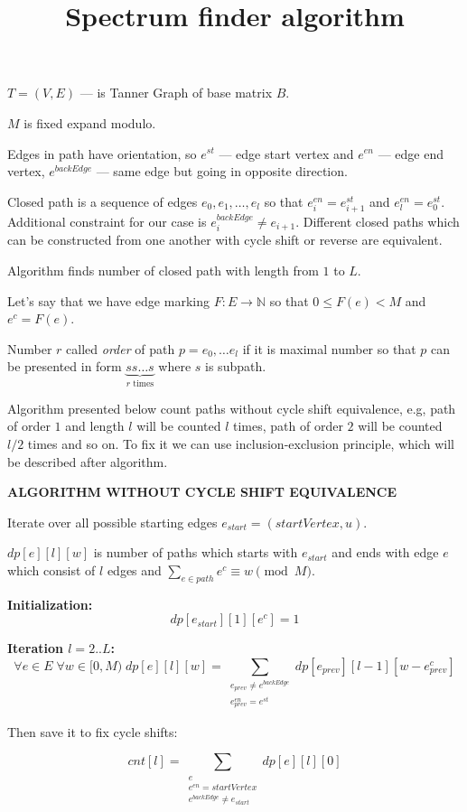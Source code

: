 \documentclass{article}
\title{Spectrum finder algorithm}
\begin{document}
\maketitle

$T = (V, E)$ --- is Tanner Graph of base matrix $B$.

$M$ is fixed expand modulo.

Edges in path have orientation, so $e^{st}$ --- edge start vertex and $e^{en}$ --- edge end vertex,
$e^{backEdge}$ --- same edge but going in opposite direction.

Closed path is a sequence of edges $e_0, e_1, \ldots, e_l$ so that $e^{en}_i = e^{st}_{i + 1}$ and $e^{en}_l = e^{st}_0$. Additional constraint for our case is $e^{backEdge}_i \neq e_{i+1}$. Different closed paths which can be constructed from one another with cycle shift or reverse are equivalent.

Algorithm finds number of closed path with length from $1$ to $L$.

Let's say that we have edge marking $F: E \rightarrow \mathbb{N}$ so that $0 \leq F(e) < M$ and $e^c = F(e)$.

Number $r$ called \textit{order} of path $p = e_0, \ldots e_l$ if it is maximal number so that $p$ can be 
presented in form $\underbrace{ss\ldots s}_{r \text{ times}}$ where $s$ is subpath.

Algorithm presented below count paths without cycle shift equivalence, e.g,
path of order $1$ and length $l$ will be counted $l$ times, path of order $2$ will be counted $l/2$ times
and so on. To fix it we can use inclusion-exclusion principle, which will be described after algorithm.

\textbf{ALGORITHM WITHOUT CYCLE SHIFT EQUIVALENCE}

Iterate over all possible starting edges $e_{start}=(startVertex,u)$.

$dp[e][l][w]$ is number of paths which starts with $e_{start}$ and ends with edge $e$ which consist of $l$ edges and $\sum_{e \in path} e^c \equiv w \pmod{M}$.

\textbf{Initialization:} 
\[
dp[e_{start}][1][e^c] =1
\]

\textbf{Iteration $l = 2..L$:} 
\[
\forall e \in E\; \forall w \in [0, M)\;  dp[e][l][w] = \sum_{\substack{e_{prev} \neq e^{backEdge} \\ e_{prev}^{en} = e^{st}}} dp[e_{prev}][l - 1][w - e_{prev}^c]
\]

Then save it to fix cycle shifts:

\[
cnt[l] = \sum_{\substack{e \\ e^{en} = startVertex \\ e^{backEdge} \neq e_{start}}} dp[e][l][0]
\]
\end{document}
